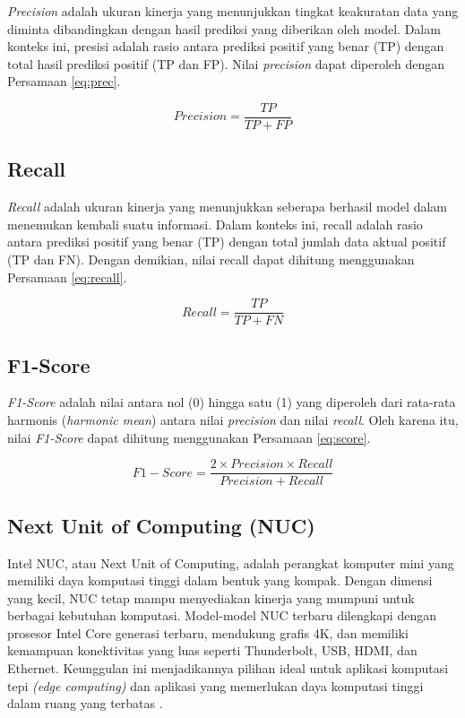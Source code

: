 \emph{Precision} adalah ukuran kinerja yang menunjukkan tingkat keakuratan data yang diminta dibandingkan dengan hasil prediksi yang diberikan oleh model. Dalam konteks ini, presisi adalah rasio antara prediksi positif yang benar (TP) dengan total hasil prediksi positif (TP dan FP). Nilai \emph{precision} dapat diperoleh dengan Persamaan \ref{eq:prec}.

\begin{equation}
  \label{eq:prec}
  Precision=\frac{TP}{TP+FP}
\end{equation}

\subsection{Recall}
\label{subsec:recall_klasifikasi}

\emph{Recall} adalah ukuran kinerja yang menunjukkan seberapa berhasil model dalam menemukan kembali suatu informasi. Dalam konteks ini, recall adalah rasio antara prediksi positif yang benar (TP) dengan total jumlah data aktual positif (TP dan FN). Dengan demikian, nilai recall dapat dihitung menggunakan Persamaan \ref{eq:recall}.

\begin{equation}
  \label{eq:recall}
  Recall=\frac{TP}{TP+FN}
\end{equation}

\subsection{F1-Score}
\label{subsec:score_klasifikasi}

\emph{F1-Score} adalah nilai antara nol (0) hingga satu (1) yang diperoleh dari rata-rata harmonis (\emph{harmonic mean}) antara nilai \emph{precision} dan nilai \emph{recall}. Oleh karena itu, nilai \emph{F1-Score} dapat dihitung menggunakan Persamaan \ref{eq:score}.

\begin{equation}
  \label{eq:score}
  F{1}{-}Score=\frac{2 \times Precision \times Recall}{Precision+Recall}
\end{equation}

\subsection{Next Unit of Computing (NUC)}

Intel NUC, atau Next Unit of Computing, adalah perangkat komputer mini yang memiliki daya komputasi tinggi dalam bentuk yang kompak. Dengan dimensi yang kecil, NUC tetap mampu menyediakan kinerja yang mumpuni untuk berbagai kebutuhan komputasi. Model-model NUC terbaru dilengkapi dengan prosesor Intel Core generasi terbaru, mendukung grafis 4K, dan memiliki kemampuan konektivitas yang luas seperti Thunderbolt, USB, HDMI, dan Ethernet. Keunggulan ini menjadikannya pilihan ideal untuk aplikasi komputasi tepi \emph{(edge computing)} dan aplikasi yang memerlukan daya komputasi tinggi dalam ruang yang terbatas \cite{intel_nuc}.